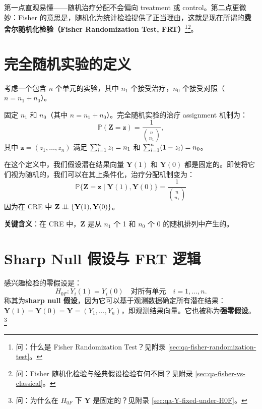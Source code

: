 第一点直观易懂——随机治疗分配不会偏向 treatment 或 control。第二点更微妙：Fisher 的意思是，随机化为统计检验提供了正当理由，这就是现在所谓的\textbf{费舍尔随机化检验（Fisher Randomization Test, FRT）}\footnote{问：什么是 Fisher Randomization Test？见附录 \cref{sec:qa-fisher-randomization-test}。}\footnote{问：Fisher 随机化检验与经典假设检验有何不同？见附录 \cref{sec:qa-fisher-vs-classical}。}。

\section{完全随机实验的定义}
\label{sec:cre-definition}

考虑一个包含 $n$ 个单元的实验，其中 $n_1$ 个接受治疗，$n_0$ 个接受对照（$n = n_1 + n_0$）。

\begin{Definition}\label{def:cre}
固定 $n_1$ 和 $n_0$（其中 $n = n_1 + n_0$）。完全随机实验的治疗 assignment 机制为：
\begin{equation}
\mathbb{P}(\mathbf{Z} = \mathbf{z}) = \frac{1}{\binom{n}{n_1}},
\label{eq:cre-assignment}
\end{equation}
其中 $\mathbf{z} = (z_1,\ldots, z_n)$ 满足 $\sum_{i=1}^n z_i = n_1$ 和 $\sum_{i=1}^n (1-z_i) = n_0$。
\end{Definition}

在这个定义中，我们假设潜在结果向量 $\mathbf{Y}(1)$ 和 $\mathbf{Y}(0)$ 都是固定的。即使将它们视为随机的，我们可以在其上条件化，治疗分配机制变为：
\begin{equation}
\mathbb{P}\{\mathbf{Z} = \mathbf{z} \mid \mathbf{Y}(1), \mathbf{Y}(0)\} = \frac{1}{\binom{n}{n_1}}
\label{eq:cre-conditional}
\end{equation}
因为在 CRE 中 $\mathbf{Z} \mathrel{\perp\!\!\!\perp} \{\mathbf{Y}(1), \mathbf{Y}(0)\}$。

\textbf{关键含义}：在 CRE 中，$\mathbf{Z}$ 是从 $n_1$ 个 1 和 $n_0$ 个 0 的随机排列中产生的。

\section{Sharp Null 假设与 FRT 逻辑}
\label{sec:sharp-null}

\citet{Fisher:1935} 感兴趣检验的零假设是：
\begin{equation}
H_{0F}: Y_i(1) = Y_i(0) \quad \text{对所有单元} \quad i=1,\ldots, n.
\label{eq:fisher-sharp-null}
\end{equation}
\citet{Rubin:1980} 称其为\textbf{sharp null 假设}，因为它可以基于观测数据确定所有潜在结果：$\mathbf{Y}(1) = \mathbf{Y}(0) = \mathbf{Y} = (Y_1, \ldots, Y_n)$，即观测结果向量。它也被称为\textbf{强零假设}。\footnote{问：为什么在 $H_{0F}$ 下 $\mathbf{Y}$ 是固定的？见附录 \cref{sec:qa-Y-fixed-under-H0F}。}

